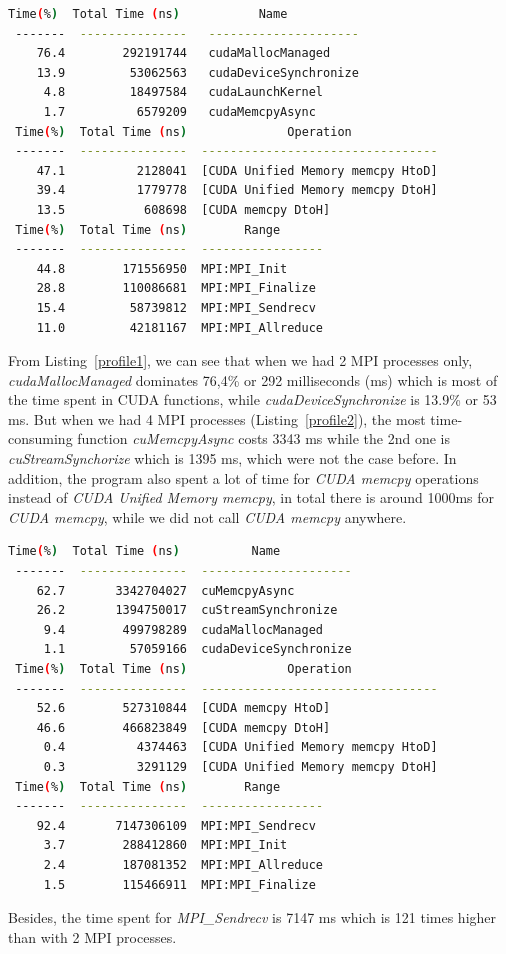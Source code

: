 \documentclass[article]{scrartcl}
\begin{document}
\begin{lstlisting}[frame=single,language=bash,caption={Profiling of cuda-aware, gridsize 512 x 512, 2 MPI processes}, label={profile1}, captionpos=b]
 Time(%)  Total Time (ns)           Name    
 -------  ---------------   ---------------------
    76.4        292191744   cudaMallocManaged    
    13.9         53062563   cudaDeviceSynchronize
     4.8         18497584   cudaLaunchKernel    
     1.7          6579209   cudaMemcpyAsync    
 Time(%)  Total Time (ns)              Operation    
 -------  ---------------  ---------------------------------
    47.1          2128041  [CUDA Unified Memory memcpy HtoD]
    39.4          1779778  [CUDA Unified Memory memcpy DtoH]
    13.5           608698  [CUDA memcpy DtoH]   
 Time(%)  Total Time (ns)        Range
 -------  ---------------  -----------------
    44.8        171556950  MPI:MPI_Init
    28.8        110086681  MPI:MPI_Finalize
    15.4         58739812  MPI:MPI_Sendrecv
    11.0         42181167  MPI:MPI_Allreduce
\end{lstlisting}
From Listing~\ref{profile1}, we can see that when we had 2 MPI processes only, \textit{cudaMallocManaged} dominates 76,4\% or 292 milliseconds (ms) which is most of the time spent in CUDA functions, while \textit{cudaDeviceSynchronize} is 13.9\% or 53 ms. But when we had 4 MPI processes (Listing~\ref{profile2}), the most time-consuming function \textit{cuMemcpyAsync} costs 3343 ms while the 2nd one is \textit{cuStreamSynchorize} which is 1395 ms, which were not the case before. In addition, the program also spent a lot of time for \textit{CUDA memcpy} operations instead of \textit{CUDA Unified Memory memcpy}, in total there is around 1000ms for \textit{CUDA memcpy}, while we did not call \textit{CUDA memcpy} anywhere. 

\begin{lstlisting}[frame=single,language=bash,caption={Profiling of cuda-aware, gridsize 512 x 512, 4 MPI processes},label={profile2}, captionpos=b]
 Time(%)  Total Time (ns)          Name    
 -------  ---------------  ---------------------
    62.7       3342704027  cuMemcpyAsync    
    26.2       1394750017  cuStreamSynchronize  
     9.4        499798289  cudaMallocManaged    
     1.1         57059166  cudaDeviceSynchronize
 Time(%)  Total Time (ns)              Operation
 -------  ---------------  ---------------------------------
    52.6        527310844  [CUDA memcpy HtoD]
    46.6        466823849  [CUDA memcpy DtoH]
     0.4          4374463  [CUDA Unified Memory memcpy HtoD]
     0.3          3291129  [CUDA Unified Memory memcpy DtoH]
 Time(%)  Total Time (ns)        Range
 -------  ---------------  -----------------
    92.4       7147306109  MPI:MPI_Sendrecv
     3.7        288412860  MPI:MPI_Init
     2.4        187081352  MPI:MPI_Allreduce
     1.5        115466911  MPI:MPI_Finalize
\end{lstlisting}
\pagebreak
Besides, the time spent for \textit{MPI\_Sendrecv} is 7147 ms which is 121 times higher than with 2 MPI processes. 
\end{document}
